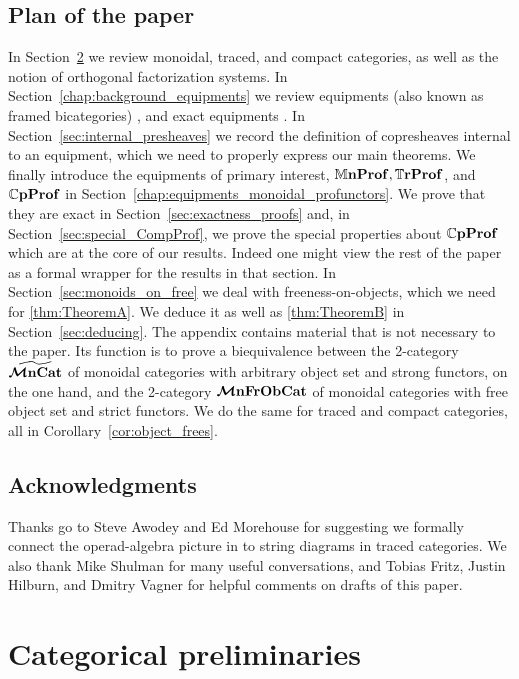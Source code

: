 \documentclass[11pt,oneside,article]{memoir}
\begin{document}
\section{Plan of the paper}

In Section~\ref{chap:traced_categories} we review monoidal, traced, and compact categories, as well
as the notion of orthogonal factorization systems. In Section~\ref{chap:background_equipments} we
review equipments (also known as framed bicategories) \cite{Shulman}, and exact equipments
\cite{Schultz2015}. In Section~\ref{sec:internal_presheaves} we record the definition of
copresheaves internal to an equipment, which we need to properly express our main theorems. We
finally introduce the equipments of primary interest, $\mathbb{M}\mathbf{nProf}, \mathbb{T}\mathbf{rProf}$, and $\mathbb{C}\mathbf{pProf}$ in
Section~\ref{chap:equipments_monoidal_profunctors}. We prove that they are exact in
Section~\ref{sec:exactness_proofs} and, in Section~\ref{sec:special_CompProf}, we prove the special
properties about $\mathbb{C}\mathbf{pProf}$ which are at the core of our results. Indeed one might view the rest
of the paper as a formal wrapper for the results in that section. In
Section~\ref{sec:monoids_on_free} we deal with freeness-on-objects, which we need for
\ref{thm:TheoremA}. We deduce it as well as \ref{thm:TheoremB} in Section~\ref{sec:deducing}. The
appendix contains material that is not necessary to the paper. Its function is to prove a
biequivalence between the 2-category $\widetilde{\bm{\mathcal{M}}\mathbf{nCat}}$ of monoidal categories with arbitrary object
set and strong functors, on the one hand, and the 2-category $\bm{\mathcal{M}}\mathbf{nFrObCat}$ of monoidal categories
with free object set and strict functors. We do the same for traced and compact categories, all in
Corollary~\ref{cor:object_frees}.

\section*{Acknowledgments}

Thanks go to Steve Awodey and Ed Morehouse for suggesting we formally connect the operad-algebra
picture in \cite{RupelSpivak} to string diagrams in traced categories. We also thank Mike Shulman
for many useful conversations, and Tobias Fritz, Justin Hilburn, and Dmitry Vagner for helpful
comments on drafts of this paper.

\chapter{Categorical preliminaries}
      \label{chap:traced_categories}
\end{document}
